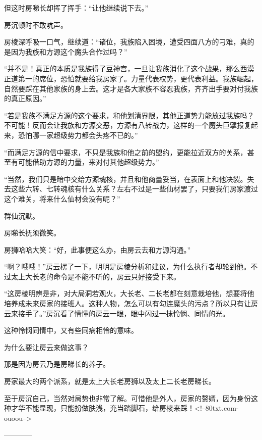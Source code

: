 \begin{this_body}
但这时房睇长却挥了挥手：“让他继续说下去。”

房沉顿时不敢吭声。

房棱深呼吸一口气，继续道：“诸位，我族陷入困境，遭受四面八方的刁难，真的是因为我族和方源这个魔头合作过吗？”

“并不是！真正的本质是我族得了豆神宫，一旦让我族消化了这个战果，那么西漠正道第一的席位，恐怕就要给我房家了。力量代表权势，更代表利益。我族崛起，自然要踩在其他家族的身上去。这才是各大家族不容忍我族，齐齐出手要对付我族的真正原因。”

“若是我族不满足方源的这个要求，和他划清界限，其他正道势力能放过我族吗？不可能！反而会让我族和方源交恶，方源有八转战力，这样的一个魔头巨擘报复起来，恐怕哪一家超级势力都会头疼不已的。”

“而满足方源的信中要求，不只是我族和他之前的盟约，更能拉近双方的关系，甚至有可能借助方源的力量，来对付其他超级势力。”

“当然，我们只是暗中交给方源魂核，并且和他商量妥当，在表面上和他决裂。失去这些六转、七转魂核有什么关系？左右不过是一些仙材罢了，只要我们房家渡过这个难关，将来什么仙材会没有呢？”

群仙沉默。

房睇长抚须微笑。

房狮哈哈大笑：“好，此事便这么办，由房云去和方源沟通。”

“啊？哦哦！”房云楞了一下，明明是房棱分析和建议，为什么执行者却轮到他。不过太上大长老的命令是不能不听的，房云只好接受下来。

“这房棱明辨是非，对大局洞若观火，大长老、二长老都在刻意栽培他，想要将他培养成未来房家的接班人。这种人物，怎么可以有勾连魔头的污点？所以只有让房云来接手了。”房沉看了懵懂的房云一眼，眼中闪过一抹怜悯、同情的光。

这种怜悯同情中，又有些同病相怜的意味。

为什么要让房云来做这事？

那是因为房云乃是房睇长的养子。

房家最大的两个派系，就是太上大长老房狮以及太上二长老房睇长。

至于房沉自己，当然对局势也非常了解。可惜他是外人，房家的赘婿，因为身份这种才华不能显现，只能扮做肤浅，充当踏脚石，给房棱来踩！<!--80txt.com-ouoou-->

------------

\end{this_body}


